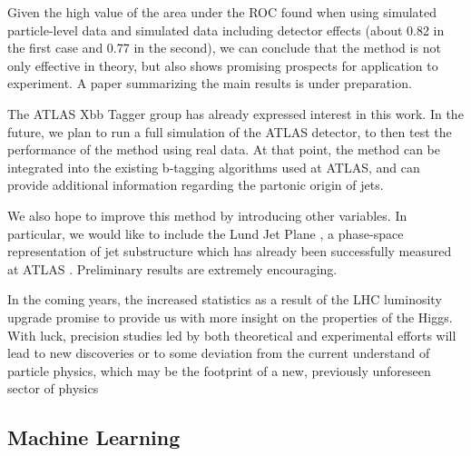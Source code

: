 \documentclass[10pt,a4paper]{book}
\begin{document}
Given the high value of the area under the ROC found when using simulated particle-level data and simulated data including detector effects (about 0.82 in the first case and 0.77 in the second), we can conclude that the method is not only effective in theory, but also shows promising prospects for application to experiment. A paper summarizing the main results is under preparation.

The ATLAS Xbb Tagger group has already expressed interest in this work. In the future, we plan to run a full simulation of the ATLAS detector, to then test the performance of the method using real data. At that point, the method can be integrated into the existing b-tagging algorithms used at ATLAS, and can provide additional information regarding the partonic origin of jets.

We also hope to improve this method by introducing other variables. In particular, we would like to include the Lund Jet Plane \cite{Dreyer:2018nbf}, a phase-space representation of jet substructure which has already been successfully measured at ATLAS \cite{ATLAS:2020bbn}. Preliminary results are extremely encouraging. 

In the coming years, the increased statistics as a result of the LHC luminosity upgrade promise to provide us with more insight on the properties of the Higgs. With luck, precision studies led by both theoretical and experimental efforts will lead to new discoveries or to some deviation from the current understand of particle physics, which may be the footprint of a new, previously unforeseen sector of physics 


\begin{appendices}
\chapter{Machine Learning}
\label{Appendix}

\end{appendices}



\end{document}
